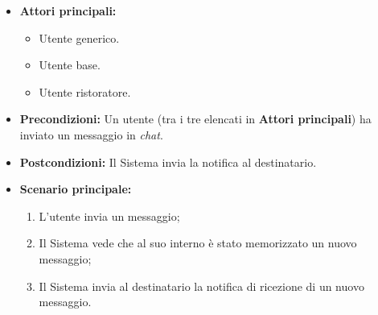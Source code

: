 \label{usecase:Notifica chat}
\begin{itemize}
    \item \textbf{Attori principali:} 
	\begin{itemize}
        \item Utente generico.
        \item Utente base.
        \item Utente ristoratore.
    \end{itemize}
	
	\item \textbf{Precondizioni:} Un utente (tra i tre elencati in \textbf{Attori principali}) ha inviato un messaggio in \textit{chat}.

	\item \textbf{Postcondizioni:} Il Sistema invia la notifica al destinatario.
     
	\item \textbf{Scenario principale:}
	      \begin{enumerate}
                \item L'utente invia un messaggio;
                \item Il Sistema vede che al suo interno è stato memorizzato un nuovo messaggio;
                \item Il Sistema invia al destinatario la notifica di ricezione di un nuovo messaggio.
	      \end{enumerate}
\end{itemize}